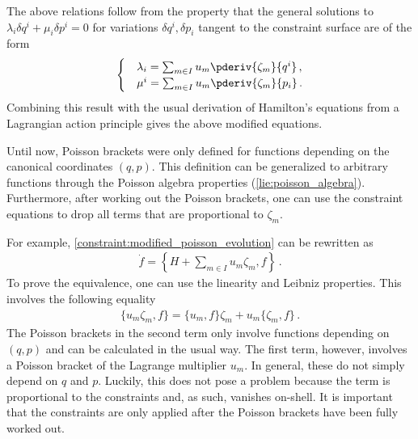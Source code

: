     \begin{remark}
        The above relations follow from the property that the general solutions to $\lambda_i\delta q^i + \mu_i\delta p^i = 0$ for variations $\delta q^i,\delta p_i$ tangent to the constraint surface are of the form
        \begin{gather}
            \begin{cases}
                &\lambda_i = \sum_{m\in I}u_m\pderiv{\zeta_m}{q^i}\,,\\
                &\mu^i = \sum_{m\in I}u_m\pderiv{\zeta_m}{p_i}\,.
            \end{cases}
        \end{gather}
        Combining this result with the usual derivation of Hamilton's equations from a Lagrangian action principle gives the above modified equations.
    \end{remark}

    \begin{method}
        Until now, Poisson brackets were only defined for functions depending on the canonical coordinates $(q,p)$. This definition can be generalized to arbitrary functions through the Poisson algebra properties (\cref{lie:poisson_algebra}). Furthermore, after working out the Poisson brackets, one can use the constraint equations to drop all terms that are proportional to $\zeta_m$.

        For example, \cref{constraint:modified_poisson_evolution} can be rewritten as
        \begin{gather}
            \dot{f} = \left\{H + \sum_{m\in I}u_m\zeta_m,f\right\}\,.
        \end{gather}
        To prove the equivalence, one can use the linearity and Leibniz properties. This involves the following equality
        \begin{gather}
            \{u_m\zeta_m, f\} = \{u_m,f\}\zeta_m + u_m\{\zeta_m,f\}\,.
        \end{gather}
        The Poisson brackets in the second term only involve functions depending on $(q,p)$ and can be calculated in the usual way. The first term, however, involves a Poisson bracket of the Lagrange multiplier $u_m$. In general, these do not simply depend on $q$ and $p$. Luckily, this does not pose a problem because the term is proportional to the constraints and, as such, vanishes on-shell. It is important that the constraints are only applied after the Poisson brackets have been fully worked out.
    \end{method}

